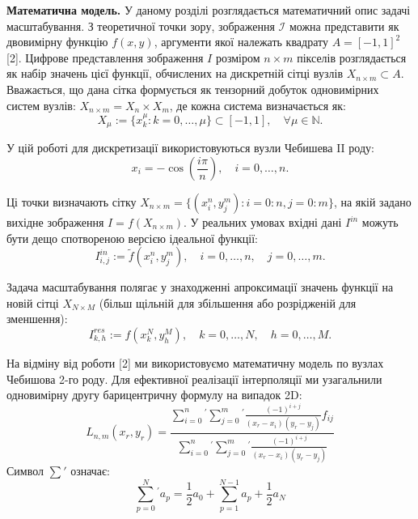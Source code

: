 \textbf{Математична модель.}
У даному розділі розглядається математичний опис задачі масштабування. З теоретичної точки зору, зображення $\mathcal{I}$ можна представити як двовимірну функцію $f(x,y)$, аргументи якої належать квадрату $A = [-1, 1]^2$ [2]. Цифрове представлення зображення $I$ розміром $n \times m$ пікселів розглядається як набір значень цієї функції, обчислених на дискретній сітці вузлів $X_{n \times m} \subset A$. Вважається, що дана сітка формується як тензорний добуток одновимірних систем вузлів: $X_{n \times m} = X_n \times X_m$, де кожна система визначається як:
\begin{equation}
	X_{\mu} := \{ x_k^\mu : k = 0, \dots, \mu \} \subset [-1, 1], \quad \forall \mu \in \mathbb{N}.
\end{equation}

У цій роботі для дискретизації використовуються вузли Чебишева II роду:
\begin{equation}
	x_i = -\cos\left(\frac{i\pi}{n}\right), \quad i = 0, \dots, n.
\end{equation}

Ці точки визначають сітку $X_{n \times m} = \{ (x_i^n, y_j^m) : i=0:n, j=0:m \}$, на якій задано вихідне зображення $I = f(X_{n \times m})$. У реальних умовах вхідні дані $I^{in}$ можуть бути дещо спотвореною версією ідеальної функції:
\begin{equation}
	I_{i,j}^{in} := \tilde{f}(x_i^n, y_j^m), \quad i = 0, \dots, n, \quad j = 0, \dots, m.
\end{equation}

Задача масштабування полягає у знаходженні апроксимації значень функції на новій сітці $X_{N \times M}$ (більш щільній для збільшення або розрідженій для зменшення):
\begin{equation}
	I_{k,h}^{res} := f(x_k^N, y_h^M), \quad k = 0, \dots, N, \quad h = 0, \dots, M.
\end{equation}

На відміну від роботи [2] ми використовуємо математичну модель по вузлах Чебишова 2-го роду. Для ефективної реалізації інтерполяції ми узагальнили одновимірну другу барицентричну формулу на випадок  2D:
\begin{equation*}
	L_{n,m}(x_r, y_r) = \frac{\sum\limits_{i=0}^{n}{}^{\prime} \sum\limits_{j=0}^{m}{}^{\prime} \frac{(-1)^{i+j}}{(x_r-x_i)(y_r-y_j)} f_{ij}}{\sum\limits_{i=0}^{n}{}^{\prime} \sum\limits_{j=0}^{m}{}^{\prime} \frac{(-1)^{i+j}}{(x_r-x_i)(y_r-y_j)}}
\end{equation*}
Символ $\sum'$ означає:
\begin{equation*}
	\sum_{p=0}^{N}{}^{\prime} a_p = \frac{1}{2} a_0 + \sum_{p=1}^{N-1} a_p + \frac{1}{2} a_N
\end{equation*}

